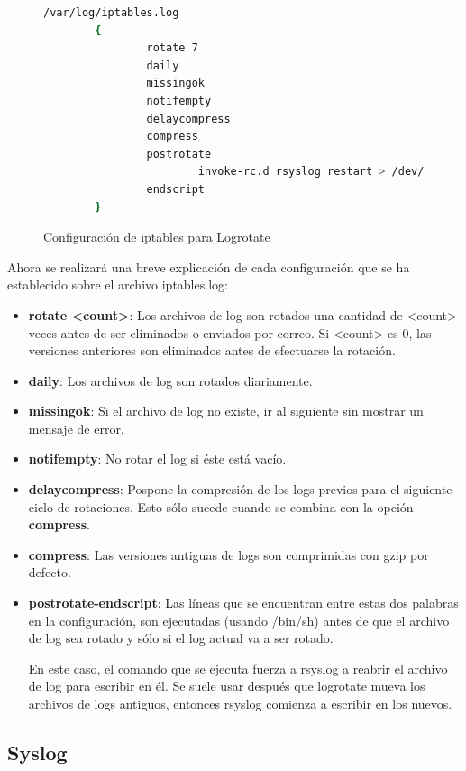 \begin{figure}[H]
\begin{lstlisting}[language=bash]
/var/log/iptables.log
        {
                rotate 7
                daily
                missingok
                notifempty
                delaycompress
                compress
                postrotate
                        invoke-rc.d rsyslog restart > /dev/null
                endscript
        }
\end{lstlisting}
\caption{Configuración de iptables para Logrotate}
\end{figure}

Ahora se realizará una breve explicación de cada configuración que se ha establecido sobre el archivo iptables.log:

\begin{itemize}
\item \textbf{rotate <count>}: Los archivos de log son rotados una cantidad de <count> veces antes de ser eliminados o enviados por correo. Si <count> es 0, las versiones anteriores son eliminados antes de efectuarse la rotación.
\item \textbf{daily}: Los archivos de log son rotados diariamente.
\item \textbf{missingok}: Si el archivo de log no existe, ir al siguiente sin mostrar un mensaje de error.
\item \textbf{notifempty}: No rotar el log si éste está vacío.
\item \textbf{delaycompress}: Pospone la compresión de los logs previos para el siguiente ciclo de rotaciones. Esto sólo sucede cuando se combina con la opción \textbf{compress}.
\item \textbf{compress}: Las versiones antiguas de logs son comprimidas con gzip por defecto.
\item \textbf{postrotate-endscript}: Las líneas que se encuentran entre estas dos palabras en la configuración, son ejecutadas (usando /bin/sh) antes de que el archivo de log sea rotado y sólo si el log actual va a ser rotado.

  En este caso, el comando que se ejecuta fuerza a rsyslog a reabrir el archivo de log para escribir en él. Se suele usar después que logrotate mueva los archivos de logs antiguos, entonces rsyslog comienza a escribir en los nuevos.
\end{itemize}

\subsection{Syslog}

